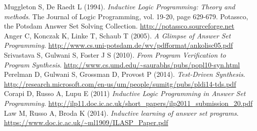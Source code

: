 \documentclass[a4paper,twoside,notitlepage]{article}
\begin{document}
\begin{thebibliography}{9}
        Muggleton S, De Raedt L (1994).
        \emph{Inductive Logic Programming: Theory and methods}.
        The Journal of Logic Programming, vol. 19-20, page 629-679.
        Potassco, the Potsdam Answer Set Solving Collection. 
        \url{http://potassco.sourceforge.net}
        Anger C, Konczak K, Linke T, Schaub T (2005).
        \emph{A Glimpse of Answer Set Programming}. 
        \url{http://www.cs.uni-potsdam.de/wv/pdfformat/ankolisc05.pdf}
        Srivastava S, Gulwani S, Foster J S (2010).
        \emph{From Program Verification to Program Synthesis}.
        \url{http://www.cs.umd.edu/~saurabhs/pubs/popl10-syn.html}
        Perelman D, Gulwani S, Grossman D, Provost P (2014).
        \emph{Test-Driven Synthesis}.
        \url{http://research.microsoft.com/en-us/um/people/sumitg/pubs/pldi14-tds.pdf}
        Corapi D, Russo A, Lupu E (2011)
        \emph{Inductive Logic Programming in Answer Set Programming}. 
        \url{http://ilp11.doc.ic.ac.uk/short_papers/ilp2011_submission_20.pdf}
        Law M, Russo A, Broda K (2014).
        \emph{Inductive learning of answer set programs}.
        \url{https://www.doc.ic.ac.uk/~ml1909/ILASP_Paper.pdf}
\end{thebibliography}
\end{document}
